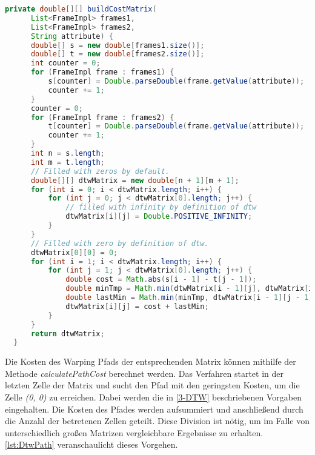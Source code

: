 \begin{lstfloat}
\begin{lstlisting}[language=Java, label={lst:DtwMatrix}, caption=DTW: Kostenmatrix.]
  private double[][] buildCostMatrix(
      List<FrameImpl> frames1,
      List<FrameImpl> frames2,
      String attribute) {
      double[] s = new double[frames1.size()];
      double[] t = new double[frames2.size()];
      int counter = 0;
      for (FrameImpl frame : frames1) {
          s[counter] = Double.parseDouble(frame.getValue(attribute));
          counter += 1;
      }
      counter = 0;
      for (FrameImpl frame : frames2) {
          t[counter] = Double.parseDouble(frame.getValue(attribute));
          counter += 1;
      }
      int n = s.length;
      int m = t.length;
      // Filled with zeros by default.
      double[][] dtwMatrix = new double[n + 1][m + 1];
      for (int i = 0; i < dtwMatrix.length; i++) {
          for (int j = 0; j < dtwMatrix[0].length; j++) {
              // filled with infinity by definition of dtw
              dtwMatrix[i][j] = Double.POSITIVE_INFINITY;
          }
      }
      // Filled with zero by definition of dtw.
      dtwMatrix[0][0] = 0;
      for (int i = 1; i < dtwMatrix.length; i++) {
          for (int j = 1; j < dtwMatrix[0].length; j++) {
              double cost = Math.abs(s[i - 1] - t[j - 1]);
              double minTmp = Math.min(dtwMatrix[i - 1][j], dtwMatrix[i][j - 1]);
              double lastMin = Math.min(minTmp, dtwMatrix[i - 1][j - 1]);
              dtwMatrix[i][j] = cost + lastMin;
          }
      }
      return dtwMatrix;
  }
\end{lstlisting}
\end{lstfloat}
Die Kosten des Warping Pfads der entsprechenden Matrix können mithilfe der Methode \emph{calculatePathCost}
berechnet werden.
Das Verfahren startet in der letzten Zelle der Matrix und sucht den Pfad mit den geringsten Kosten,
um die Zelle \emph{(0, 0)} zu erreichen.
Dabei werden die in \autoref{3-DTW} beschriebenen Vorgaben eingehalten.
Die Kosten des Pfades werden aufsummiert und anschließend durch die Anzahl der betretenen Zellen geteilt.
Diese Division ist nötig, um im Falle von unterschiedlich großen Matrizen vergleichbare Ergebnisse zu erhalten.
\autoref{lst:DtwPath} veranschaulicht dieses Vorgehen.
